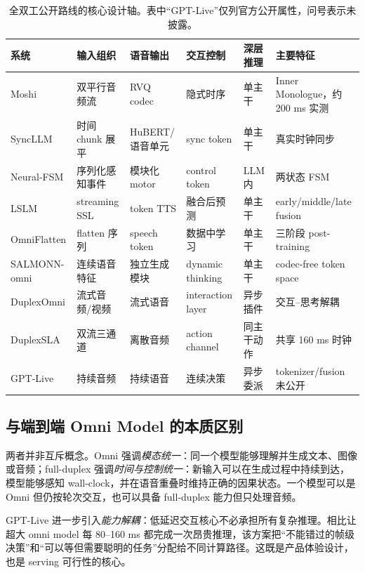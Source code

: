 \begin{table}[H]
\centering\scriptsize
\setlength{\tabcolsep}{3pt}
\caption{全双工公开路线的核心设计轴。表中“GPT-Live”仅列官方公开属性，问号表示未披露。}
\begin{tabularx}{\textwidth}{lXXXXX}
\toprule
系统 & 输入组织 & 语音输出 & 交互控制 & 深层推理 & 主要特征 \\
\midrule
Moshi & 双平行音频流 & RVQ codec & 隐式时序 & 单主干 & Inner Monologue，约 200 ms 实测 \\
SyncLLM & 时间 chunk 展平 & HuBERT/语音单元 & sync token & 单主干 & 真实时钟同步 \\
Neural-FSM & 序列化感知事件 & 模块化 motor & control token & LLM 内 & 两状态 FSM \\
LSLM & streaming SSL & token TTS & 融合后预测 & 单主干 & early/middle/late fusion \\
OmniFlatten & flatten 序列 & speech token & 数据中学习 & 单主干 & 三阶段 post-training \\
SALMONN-omni & 连续语音特征 & 独立生成模块 & dynamic thinking & 单主干 & codec-free token space \\
DuplexOmni & 流式音频/视频 & 流式语音 & interaction layer & 异步插件 & 交互--思考解耦 \\
DuplexSLA & 双流三通道 & 离散音频 & action channel & 同主干动作 & 共享 160 ms 时钟 \\
GPT-Live & 持续音频 & 持续语音 & 连续决策 & 异步委派 & tokenizer/fusion 未公开 \\
\bottomrule
\end{tabularx}
\end{table}

\subsection{与端到端 Omni Model 的本质区别}

两者并非互斥概念。Omni 强调\emph{模态统一}：同一个模型能够理解并生成文本、图像或音频；full-duplex 强调\emph{时间与控制统一}：新输入可以在生成过程中持续到达，模型能够感知 wall-clock，并在语音重叠时维持正确的因果状态。一个模型可以是 Omni 但仍按轮次交互，也可以具备 full-duplex 能力但只处理音频。

GPT-Live 进一步引入\emph{能力解耦}：低延迟交互核心不必承担所有复杂推理。相比让超大 omni model 每 80--160 ms 都完成一次昂贵推理，该方案把“不能错过的帧级决策”和“可以等但需要聪明的任务”分配给不同计算路径。这既是产品体验设计，也是 serving 可行性的核心。
